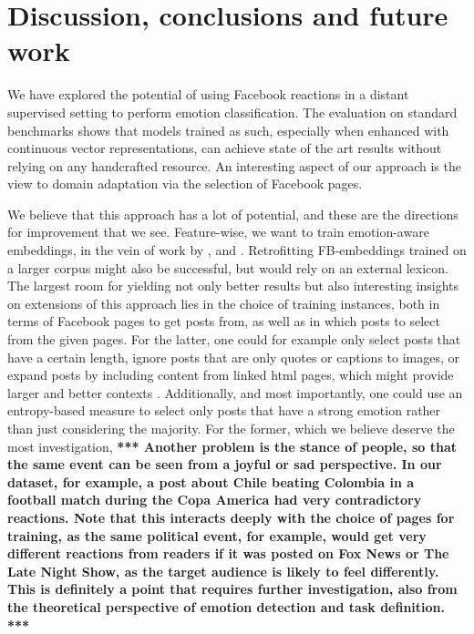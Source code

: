 \documentclass[11pt]{article}
\newcommand{\note}[1]{\textbf{*** #1 ***}}
\begin{document}
\section{Discussion, conclusions and future work}
\label{sec:conclusions}
We have explored the potential of using Facebook reactions in a distant supervised setting to perform emotion classification. The evaluation on standard benchmarks shows that models trained as such, especially when enhanced with continuous vector representations, can achieve state of the art results without relying on any handcrafted resource. An interesting aspect of our approach is the view to domain adaptation via the selection of Facebook pages.
 




We believe that this approach has a lot of potential, and these are the directions for improvement that we see. Feature-wise, we want to train emotion-aware embeddings, in the vein of work by , and \cite{iacobacci2015sensembed}. Retrofitting FB-embeddings trained on a larger corpus might also be successful, but would rely on an external lexicon. The largest room for yielding not only better results but also interesting insights on extensions of this approach lies in the choice of training instances, both in terms of Facebook pages to get posts from, as well as in which posts to select from the given pages. 
For the latter, one could for example only select posts that have a certain length, ignore posts that are only quotes or captions to images, or expand posts by including content from linked html pages, which might provide larger and better contexts \cite{plank:2014}. Additionally, and most importantly, one could use an entropy-based measure to select only posts that have a strong emotion rather than just considering the majority. For the former, which we believe deserve the most investigation, \note{
Another problem is the stance of people, so that the same event can be seen from a joyful or sad perspective. In our dataset, for example, a post about Chile beating Colombia in a football match during the Copa America had very contradictory reactions. Note that this interacts deeply with the choice of pages for training, as the same political event, for example, would get very different reactions from readers if it was posted on Fox News or The Late Night Show, as the target audience is likely to feel differently. This is definitely a point that requires further investigation, also from the theoretical perspective of emotion detection and task definition.}
\end{document}
